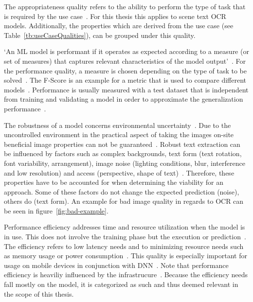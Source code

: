 The appropriateness quality refers to the ability to perform the type of task that is required by
the use case~\citep{siebert_construction_2021,nakamichi_requirements-driven_2020}.
For this thesis this applies to scene text \ac{OCR} models.
Additionally, the properties which are derived from the use case (see Table~\ref{tb:useCaseQualities}),
can be grouped under this quality.

`An ML model is performant if it operates as expected according to a measure (or set of measures)
that captures relevant characteristics of the model output'~\citep{ashmore_assuring_2021}.
For the performance quality, a measure is chosen depending on the type of task to be
solved~\citep{siebert_construction_2021}.
The F-Score is an example for a metric that is used to compare different
models~\cite{chen_text_2021, long_scene_2021}.
Performance is usually measured with a test dataset that is independent from training and validating
a model in order to approximate the generalization performance~\cite{goodfellow_deep_2016,
nakamichi_requirements-driven_2020}.

The robustness of a model concerns environmental uncertainty~\cite{ashmore_assuring_2021}.
Due to the uncontrolled environment in the practical aspect of taking the images on-site
beneficial image properties can not be guaranteed~\citep{chen_text_2021}.
Robust text extraction can be influenced by factors such as complex backgrounds, text form
(text rotation, font variability, arrangement), image noise (lighting conditions, blur,
interference and low resolution) and access (perspective, shape of
text)~\citep{oyedotun_deep_2015,ghosh_visual_2017,chen_text_2021}.
Therefore, these properties have to be accounted for when determining the viability for an approach.
Some of these factors do not change the expected prediction (noise), others do (text
form)\cite{hu_towards_2020}.
An example for bad image quality in regards to \ac{OCR} can be seen in figure~\ref{fig:bad-example}.

Performance efficiency addresses time and resource utilization when the model is in use.
This does not involve the training phase but the execution or
prediction~\citep{siebert_construction_2021}.
The efficiency refers to low latency needs and to minimizing resource needs such as memory
usage or power consumption~\citep{nakamichi_requirements-driven_2020, siebert_construction_2021,
sourvanos_challenges_2018}.
This quality is especially important for usage on mobile devices in conjunction with
\ac{DNN}~\citep{sourvanos_challenges_2018, niu_26ms_2019}.
Note that performance efficiency is heaviliy influenced by the
infrastrucure~\citep{nakamichi_requirements-driven_2020, siebert_construction_2021}.
Because the efficiency needs fall mostly on the model, it is categorized as such and thus deemed
relevant in the scope of this thesis.

